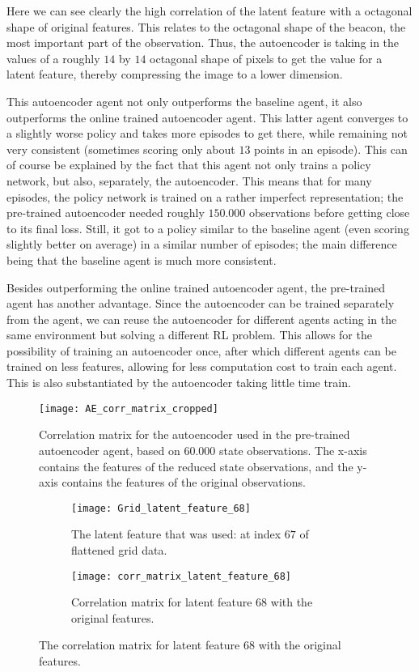 Here we can see clearly the high correlation of the latent feature with a octagonal shape of original features. This relates to the octagonal shape of the beacon, the most important part of the observation. Thus, the autoencoder is taking in the values of a roughly $14$ by $14$ octagonal shape of pixels to get the value for a latent feature, thereby compressing the image to a lower dimension.

This autoencoder agent not only outperforms the baseline agent, it also outperforms the online trained autoencoder agent. This latter agent converges to a slightly worse policy and takes more episodes to get there, while remaining not very consistent (sometimes scoring only about $13$ points in an episode). This can of course be explained by the fact that this agent not only trains a policy network, but also, separately, the autoencoder. This means that for many episodes, the policy network is trained on a rather imperfect representation; the pre-trained autoencoder needed roughly $150.000$ observations before getting close to its final loss. Still, it got to a policy similar to the baseline agent (even scoring slightly better on average) in a similar number of episodes; the main difference being that the baseline agent is much more consistent.

Besides outperforming the online trained autoencoder agent, the pre-trained agent has another advantage. Since the autoencoder can be trained separately from the agent, we can reuse the autoencoder for different agents acting in the same environment but solving a different RL problem. This allows for the possibility of training an autoencoder once, after which different agents can be trained on less features, allowing for less computation cost to train each agent. This is also substantiated by the autoencoder taking little time train.


\begin{figure}[h]
	\centering
	\texttt{[image: AE\_corr\_matrix\_cropped]}
	\caption{Correlation matrix for the autoencoder used in the pre-trained autoencoder agent, based on $60.000$ state observations. The x-axis contains the features of the reduced state observations, and the y-axis contains the features of the original observations.}
	\label{fig:ae-corr}
\end{figure}

\begin{figure}[h]
	\centering
	\begin{subfigure}[b]{0.2\textwidth}
		\texttt{[image: Grid\_latent\_feature\_68]}
		\caption{The latent feature that was used: at index $67$ of flattened grid data.}
		\label{fig:ae-latent-feature} 
	\end{subfigure}\hfill
	\begin{subfigure}[b]{0.75\textwidth}
		\texttt{[image: corr\_matrix\_latent\_feature\_68]}
		\caption{Correlation matrix for latent feature $68$ with the original features.}
		\label{fig:ae-latent-feature-corr-matrix}
	\end{subfigure}
	\caption{The correlation matrix for latent feature $68$ with the original features.}
	\label{fig:latent-feature-corr}
\end{figure}

